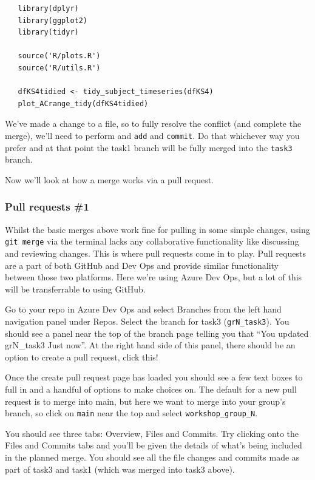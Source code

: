 \documentclass[
  12pt,
]{article}
\begin{document}
\begin{verbatim}
   library(dplyr)
   library(ggplot2)
   library(tidyr)

   source('R/plots.R')
   source('R/utils.R')

   dfKS4tidied <- tidy_subject_timeseries(dfKS4)
   plot_ACrange_tidy(dfKS4tidied)
\end{verbatim}

We've made a change to a file, so to fully resolve the conflict (and
complete the merge), we'll need to perform and \texttt{add} and
\texttt{commit}. Do that whichever way you prefer and at that point the
task1 branch will be fully merged into the \texttt{task3} branch.

Now we'll look at how a merge works via a pull request.

\hypertarget{pull-requests-1}{%
\subsubsection{Pull requests \#1}\label{pull-requests-1}}

Whilst the basic merges above work fine for pulling in some simple
changes, using \texttt{git\ merge} via the terminal lacks any
collaborative functionality like discussing and reviewing changes. This
is where pull requests come in to play. Pull requests are a part of both
GitHub and Dev Ops and provide similar functionality between those two
platforms. Here we're using Azure Dev Ops, but a lot of this will be
transferrable to using GitHub.

Go to your repo in Azure Dev Ops and select Branches from the left hand
navigation panel under Repos. Select the branch for task3
(\texttt{grN\_task3}). You should see a panel near the top of the branch
page telling you that ``You updated grN\_task3 Just now''. At the right
hand side of this panel, there should be an option to create a pull
request, click this!

Once the create pull request page has loaded you should see a few text
boxes to full in and a handful of options to make choices on. The
default for a new pull request is to merge into main, but here we want
to merge into your group's branch, so click on \texttt{main} near the
top and select \texttt{workshop\_group\_N}.

You should see three tabs: Overview, Files and Commits. Try clicking
onto the Files and Commits tabs and you'll be given the details of
what's being included in the planned merge. You should see all the file
changes and commits made as part of task3 and task1 (which was merged
into task3 above).
\end{document}
